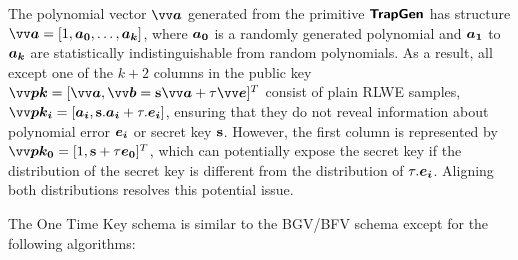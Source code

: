 The polynomial vector $\pv{a}$ generated from the primitive $\textsf{\textbf{TrapGen}}$ has structure $\pv{a} = [1, \p{a_0},\ldots,\p{a_k}]$, where $\bm{a_0}$ is a randomly generated polynomial and $\bm{a_1}$ to $\bm{a_k}$ are statistically indistinguishable from random polynomials. As a result, all except one of the $k + 2$ columns in the public key $\pv{pk}=[\pv{a},\pv{b}=\ps\pv{a}+\tau\pv{e}]^T$ consist of plain \ac{RLWE} samples, $\pv{pk_i}=[\p{a_i}, \ps.\p{a_i}+\tau.\p{e_i}]$, ensuring that they do not reveal information about polynomial error $\bm{e_i}$ or secret key $\mathbf{s}$. However, the first column is represented by $\pv{pk_0}=[1,\ps+\tau\p{e_0}]^T$, which can potentially expose the secret key if the distribution of the secret key is different from the distribution of $\tau.\bm{e_i}$. Aligning both distributions resolves this potential issue.
 
The One Time Key schema is similar to the BGV/BFV schema except for the following algorithms:

